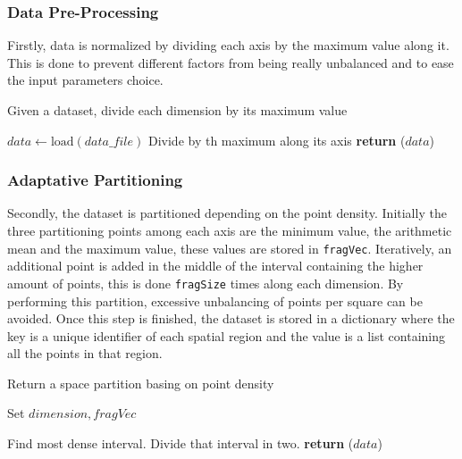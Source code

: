 \documentclass[10pt,journal,compsoc]{IEEEtran}
\let\MYoriglatexcaption\caption
\renewcommand{\caption}[2][\relax]{\MYoriglatexcaption[#2]{#2}}
\begin{document}
\subsubsection{Data Pre-Processing} \label{data_pre_process}
Firstly, data is normalized by dividing each axis by the maximum value along it. This is done to prevent different factors from being really unbalanced and to ease the input parameters choice.

\begin{algorithm}
  \caption{Given a dataset, divide each dimension by its maximum value \label{alg:normData}}
  \begin{algorithmic}[1]
		\State $data \gets \text{load}(data\_file)$
       		\State Divide by th maximum along its axis
     	\EndFor
        \State \textbf{return} ($data$)
    \EndFunction
  \end{algorithmic}
\end{algorithm}

\subsubsection{Adaptative Partitioning} \label{partition_space} 
Secondly, the dataset is partitioned depending on the point density. Initially the three partitioning points among each axis are the minimum value, the arithmetic mean and the maximum value, these values are stored in \texttt{fragVec}. Iteratively, an additional point is added in the middle of the interval containing the higher amount of points, this is done \texttt{fragSize} times along each dimension. By performing this partition, excessive unbalancing of points per square can be avoided. Once this step is finished, the dataset is stored in a dictionary where the key is a unique identifier of each spatial region and the value is a list containing all the points in that region.

\begin{algorithm}
  \caption{Return a space partition basing on point density \label{alg:partitionData}}
  \begin{algorithmic}[1]
		\State Set $dimension, fragVec$ 
        
        
                
       				\State Find most dense interval.
                \EndFor
                \State Divide that interval in two.
        	\EndFor
     	\EndFor
        \State \textbf{return} ($data$)
    \EndFunction
  \end{algorithmic}
\end{algorithm}
\end{document}
